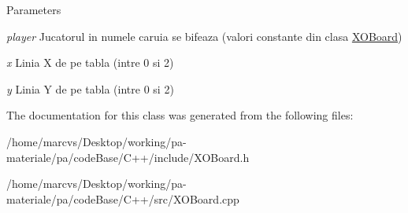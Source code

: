 \begin{DoxyParams}{Parameters}
\item[{\em player}]Jucatorul in numele caruia se bifeaza (valori constante din clasa \hyperlink{classXOBoard}{XOBoard}) \item[{\em x}]Linia X de pe tabla (intre 0 si 2) \item[{\em y}]Linia Y de pe tabla (intre 0 si 2) \end{DoxyParams}


The documentation for this class was generated from the following files:\begin{DoxyCompactItemize}
\item 
/home/marcvs/Desktop/working/pa-\/materiale/pa/codeBase/C++/include/XOBoard.h\item 
/home/marcvs/Desktop/working/pa-\/materiale/pa/codeBase/C++/src/XOBoard.cpp\end{DoxyCompactItemize}
